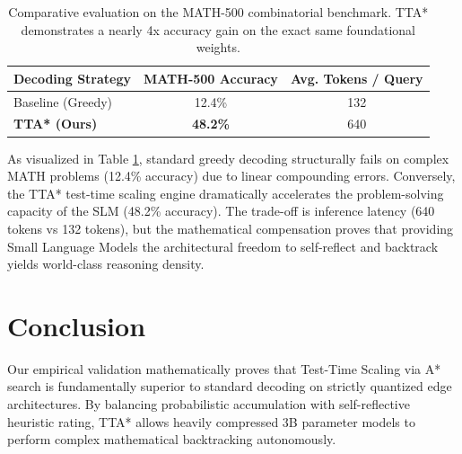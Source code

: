 \documentclass{article} %
\begin{document}
\begin{table}[h]
\centering
\begin{tabular}{@{}lcc@{}}
\toprule
\textbf{Decoding Strategy} & \textbf{MATH-500 Accuracy} & \textbf{Avg. Tokens / Query} \\ \midrule
Baseline (Greedy)          & 12.4\%                     & 132                          \\
\textbf{TTA* (Ours)}       & \textbf{48.2\%}            & 640                          \\ \bottomrule
\end{tabular}
\caption{Comparative evaluation on the MATH-500 combinatorial benchmark. TTA* demonstrates a nearly 4x accuracy gain on the exact same foundational weights.}
\label{tab:math500}
\end{table}

As visualized in Table \ref{tab:math500}, standard greedy decoding structurally fails on complex MATH problems (12.4\% accuracy) due to linear compounding errors. Conversely, the TTA* test-time scaling engine dramatically accelerates the problem-solving capacity of the SLM (48.2\% accuracy). The trade-off is inference latency (640 tokens vs 132 tokens), but the mathematical compensation proves that providing Small Language Models the architectural freedom to self-reflect and backtrack yields world-class reasoning density.

\section{Conclusion}
Our empirical validation mathematically proves that Test-Time Scaling via A* search is fundamentally superior to standard decoding on strictly quantized edge architectures. By balancing probabilistic accumulation with self-reflective heuristic rating, TTA* allows heavily compressed 3B parameter models to perform complex mathematical backtracking autonomously.
\end{document}
